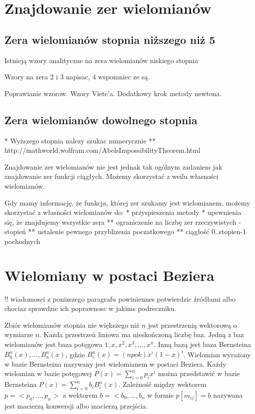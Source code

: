 \documentclass[11pt,a4paper,oneside]{report}
\begin{document}
\section{Znajdowanie zer wielomianów}

\subsection{Zera wielomianów stopnia niższego niż 5}

Istnieją wzory analityczne na zera wielomianów niskiego stopnia

Wzory na zera 2 i 3 napisac, 4 wspomniec ze są.

Poprawianie wzorow. Wzory Viete'a. Dodatkowy krok metody newtona.

\subsection{Zera wielomianów dowolnego stopnia}

* Wyższego stopnia nalezy szukac numerycznie
** http://mathworld.wolfram.com/AbelsImpossibilityTheorem.html

Znajdowanie zer wielomianów nie jest jednak tak ogólnym zadaniem jak znajdowanie zer funkcji ciągłych. Możemy skorzystać z weilu własności wielomianów.

Gdy mamy informację, że funkcja, której zer szukamy jest wielomianem, możemy skorzystać z własności wielomianów do:
* przyspieszenia metody
* upewnienia się, że znajdujemy wszystkie zera
** ograniczenie na liczbę zer rzeczywistych - stopień
** ustalenie pewnego przyblizenia poczatkowego
** ciągłość 0..stopien-1 pochodnych



\section{Wielomiany w postaci Beziera}

!! wiadomosci z ponizszego paragrafu powiniennes potwierdzic źródłami albo chociaz sprawdzic ich poprawnosc w jakims podreczniku.

Zbiór wielomianów stopnia nie większego niż $n$ jest przestrzenią wektorową o wymiarze $n$. Każda przestrzeń liniowa ma nieskończoną liczbę baz. Jedną z baz wielomianów jest baza potęgowa ${1,x,x^2,x^3,...,x^n}$. Inną bazą jest baza Bernsteina ${B^n_0(x),...,B^n_n(x)}$, gdzie $B^n_i(x) = (n po k)x^i(1-x)^i$. Wielomian wyrażony w bazie Bernsteina nazywany jest wielomianem w postaci Beziera. Każdy wielomian w bazie potęgowej $P(x) = \sum^n_{i=0}p_i x^i$ można przedstawić w bazie Bernsteina $P(x) = \sum^n_{i=0}b_i B^n_i(x)$. Zależność między wektorem $p = <p_0,...,p_n>$ a wektorem $b = <b_0, ..., b_n$ w formie $p [ m_{ij} ] = b$ nazywana jest macierzą konwersji albo macierzą przejścia.
\end{document}
